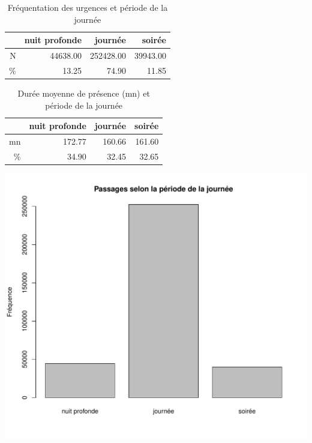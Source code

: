 \documentclass[12pt,english,french,twoside]{book}\usepackage[]{graphicx}\usepackage[]{color}
\makeatletter
\def\maxwidth{ %
  \ifdim\Gin@nat@width>\linewidth
    \linewidth
  \else
    \Gin@nat@width
  \fi
}
\newenvironment{knitrout}{}{} %
\makeatother
\begin{document}
\begin{table}[ht]
\centering
\begin{tabular}{rrrr}
  \hline
 & nuit profonde & journée & soirée \\ 
  \hline
N & 44638.00 & 252428.00 & 39943.00 \\ 
  \% & 13.25 & 74.90 & 11.85 \\ 
   \hline
\end{tabular}
\caption[Fréquentation des SU et période]{Fréquentation des urgences et période de la journée} 
\label{tab:freq_periode}
\end{table}
\begin{table}[ht]
\centering
\begin{tabular}{rrrr}
  \hline
 & nuit profonde & journée & soirée \\ 
  \hline
mn & 172.77 & 160.66 & 161.60 \\ 
  \% & 34.90 & 32.45 & 32.65 \\ 
   \hline
\end{tabular}
\caption[Durée de présence et période]{Durée  moyenne de présence (mn) et période de la journée} 
\label{duree_periode}
\end{table}



\begin{center}
\begin{knitrout}
\color{fgcolor}
\includegraphics[width=\maxwidth]{figure/bp_periode} 

\end{knitrout}

 \label{fig:bp_periode}
\end{center}
\end{document}
